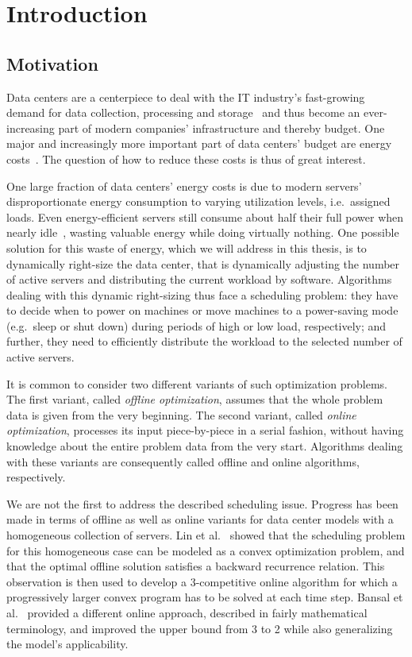 
\chapter{Introduction}
\section{Motivation}
Data centers are a centerpiece to deal with the IT industry's fast-growing demand for data collection, processing and storage~\parencite{cisco} and thus become an ever-increasing part of modern companies' infrastructure and thereby budget. One major and increasingly more important part of data centers' budget are energy costs~\parencite{hamilton}. The question of how to reduce these costs is thus of great interest.

One large fraction of data centers' energy costs is due to modern servers' disproportionate energy consumption to varying utilization levels, i.e.\ assigned loads. Even energy-efficient servers still consume about half their full power when nearly idle~\parencite{barroso}, wasting valuable energy while doing virtually nothing. One possible solution for this waste of energy, which we will address in this thesis, is to dynamically right-size the data center, that is dynamically adjusting the number of active servers and distributing the current workload by software. Algorithms dealing with this dynamic right-sizing thus face a scheduling problem: they have to decide when to power on machines or move machines to a power-saving mode (e.g.~sleep or shut down) during periods of high or low load, respectively; and further, they need to efficiently distribute the workload to the selected number of active servers.

It is common to consider two different variants of such optimization problems. The first variant, called \emph{offline optimization}, assumes that the whole problem data is given from the very beginning. The second variant, called \emph{online optimization}, processes its input piece-by-piece in a serial fashion, without having knowledge about the entire problem data from the very start. Algorithms dealing with these variants are consequently called offline and online algorithms, respectively.

We are not the first to address the described scheduling issue. Progress has been made in terms of offline as well as online variants for data center models with a homogeneous collection of servers. Lin et al.~\parencite{dyn-right-sizing} showed that the scheduling problem for this homogeneous case can be modeled as a convex optimization problem, and that the optimal offline solution satisfies a backward recurrence relation. This observation is then used to develop a 3-competitive online algorithm for which a progressively larger convex program has to be solved at each time step. Bansal et al.~\parencite{bansal-soco} provided a different online approach, described in fairly mathematical terminology, and improved the upper bound from 3 to 2 while also generalizing the model's applicability. 

